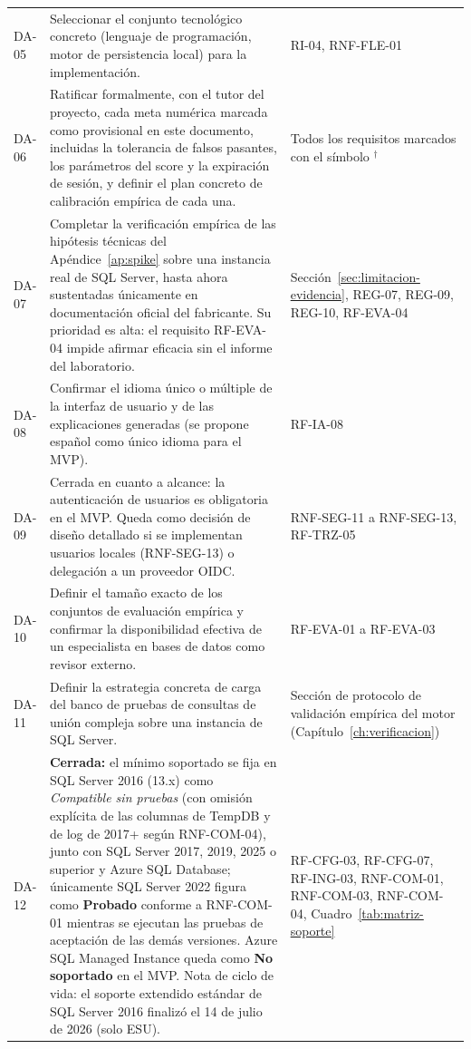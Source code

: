 \documentclass[11pt,a4paper]{report}
\newcommand{\dagsym}{\ensuremath{^{\dagger}}}
\begin{document}
\begin{xltabular}{\linewidth}{@{}p{1.3cm}Xp{2.6cm}@{}}
DA-05 & Seleccionar el conjunto tecnol\'ogico concreto (lenguaje de programaci\'on, motor de persistencia local) para la implementaci\'on. & RI-04, RNF-FLE-01 \\
DA-06 & Ratificar formalmente, con el tutor del proyecto, cada meta num\'erica marcada como provisional en este documento, incluidas la tolerancia de falsos pasantes, los par\'ametros del score y la expiraci\'on de sesi\'on, y definir el plan concreto de calibraci\'on emp\'irica de cada una. & Todos los requisitos marcados con el s\'imbolo \dagsym{} \\
DA-07 & Completar la verificaci\'on emp\'irica de las hip\'otesis t\'ecnicas del Ap\'endice~\ref{ap:spike} sobre una instancia real de SQL Server, hasta ahora sustentadas \'unicamente en documentaci\'on oficial del fabricante. Su prioridad es alta: el requisito RF-EVA-04 impide afirmar eficacia sin el informe del laboratorio. & Secci\'on~\ref{sec:limitacion-evidencia}, REG-07, REG-09, REG-10, RF-EVA-04 \\
DA-08 & Confirmar el idioma \'unico o m\'ultiple de la interfaz de usuario y de las explicaciones generadas (se propone espa\~nol como \'unico idioma para el MVP). & RF-IA-08 \\
DA-09 & Cerrada en cuanto a alcance: la autenticaci\'on de usuarios es obligatoria en el MVP. Queda como decisi\'on de dise\~no detallado si se implementan usuarios locales (RNF-SEG-13) o delegaci\'on a un proveedor OIDC. & RNF-SEG-11 a RNF-SEG-13, RF-TRZ-05 \\
DA-10 & Definir el tama\~no exacto de los conjuntos de evaluaci\'on emp\'irica y confirmar la disponibilidad efectiva de un especialista en bases de datos como revisor externo. & RF-EVA-01 a RF-EVA-03 \\
DA-11 & Definir la estrategia concreta de carga del banco de pruebas de consultas de uni\'on compleja sobre una instancia de SQL Server. & Secci\'on de protocolo de validaci\'on emp\'irica del motor (Cap\'itulo~\ref{ch:verificacion}) \\
DA-12 & \textbf{Cerrada:} el m\'inimo soportado se fija en SQL Server 2016 (13.x) como \textit{Compatible sin pruebas} (con omisi\'on expl\'icita de las columnas de TempDB y de log de 2017+ seg\'un RNF-COM-04), junto con SQL Server 2017, 2019, 2025 o superior y Azure SQL Database; \'unicamente SQL Server 2022 figura como \textbf{Probado} conforme a RNF-COM-01 mientras se ejecutan las pruebas de aceptaci\'on de las dem\'as versiones. Azure SQL Managed Instance queda como \textbf{No soportado} en el MVP. Nota de ciclo de vida: el soporte extendido est\'andar de SQL Server 2016 finaliz\'o el 14 de julio de 2026 (solo ESU). & RF-CFG-03, RF-CFG-07, RF-ING-03, RNF-COM-01, RNF-COM-03, RNF-COM-04, Cuadro~\ref{tab:matriz-soporte} \\

\end{xltabular}
\end{document}
